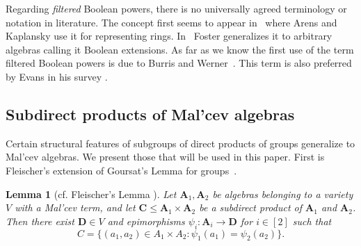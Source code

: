 \documentclass[12pt,a4paper,reqno]{amsart}
\numberwithin{equation}{section}
\theoremstyle{plain}
\newtheorem{lem}[thm]{Lemma}
\theoremstyle{definition}
\newcommand{\A}{\mathbf{A}}
\newcommand{\C}{\mathbf{C}}
\newcommand{\D}{\mathbf{D}}
\begin{document}
 Regarding \emph{filtered} Boolean powers, there is no universally agreed terminology or notation in literature. 
 The concept first seems to appear in~\cite{AK:TRA} where Arens and Kaplansky use it for representing rings.
 In~\cite{Fo:GBT1} Foster generalizes it to arbitrary algebras calling it Boolean extensions.
 As far as we know the first use of the term filtered Boolean powers is due to Burris and Werner~\cite{BW:SCT}. 
 This term is also preferred by Evans in his survey \cite{Ev:EAC}.


\subsection{Subdirect products of Mal'cev algebras} 
 Certain structural features of subgroups of direct products of groups generalize to Mal'cev algebras.
 We present those that will be used in this paper. 
 First is Fleischer's extension of Goursat's Lemma for groups~\cite[Theorem 5.5.1]{Ha:TG}.
 

\begin{lem}[cf. Fleischer's Lemma {}]
\label{la:Fleischer}
Let $\A_1,\A_2$ be algebras belonging to a variety $V$ with a Mal'cev term, and
let $\C\leq\A_1\times\A_2$ be a subdirect product of $\A_1$ and $\A_2$.
Then there exist $\D\in V$ and epimorphisms $\psi_i\colon \A_i\rightarrow\D$ for $i\in [2]$ such that
\[
C=\{ (a_1,a_2)\in A_1\times A_2\colon \psi_1(a_1)=\psi_2(a_2)\}.
\]
\end{lem}


\end{document}
